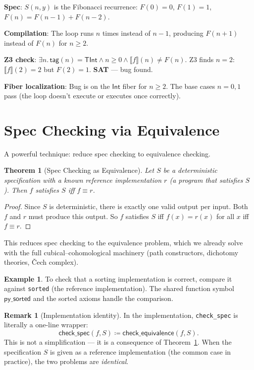 \documentclass[11pt,a4paper]{report}
\theoremstyle{definition}
\newtheorem{example}[definition]{Example}
\newtheorem{remark}[definition]{Remark}
\theoremstyle{plain}
\newtheorem{theorem}[definition]{Theorem}
\newcommand{\den}[1]{\llbracket #1 \rrbracket}
\begin{document}
\textbf{Spec}: $S(n, y)$ is the Fibonacci recurrence:
$F(0) = 0$, $F(1) = 1$, $F(n) = F(n-1) + F(n-2)$.

\textbf{Compilation}: The loop runs $n$ times instead of $n-1$,
producing $F(n+1)$ instead of $F(n)$ for $n \geq 2$.

\textbf{Z3 check}: $\exists n.\, \mathsf{tag}(n) = \mathsf{TInt}
\land n \geq 0 \land \den{f}(n) \neq F(n)$.  Z3 finds $n = 2$:
$\den{f}(2) = 2$ but $F(2) = 1$.  \textbf{SAT} --- bug found.

\textbf{Fiber localization}: Bug is on the $\mathsf{Int}$ fiber for
$n \geq 2$.  The base cases $n = 0, 1$ pass (the loop doesn't execute
or executes once correctly).

\section{Spec Checking via Equivalence}

A powerful technique: reduce spec checking to equivalence checking.

\begin{theorem}[Spec Checking as Equivalence]
\label{thm:spec-as-equiv}
Let $S$ be a deterministic specification with a known \emph{reference
implementation} $r$ (a program that satisfies $S$).  Then $f$ satisfies
$S$ iff $f \equiv r$.
\end{theorem}

\begin{proof}
Since $S$ is deterministic, there is exactly one valid output per
input.  Both $f$ and $r$ must produce this output.  So $f$ satisfies
$S$ iff $f(x) = r(x)$ for all $x$ iff $f \equiv r$.
\end{proof}

This reduces spec checking to the equivalence problem, which we
already solve with the full cubical--cohomological machinery
(path constructors, dichotomy theories, \v{C}ech complex).

\begin{example}
To check that a sorting implementation is correct, compare it against
\texttt{sorted} (the reference implementation).  The shared function
symbol $\mathsf{py\_sorted}$ and the sorted axioms handle the
comparison.
\end{example}

\begin{remark}[Implementation identity]
In the implementation, \texttt{check\_spec} is literally
a one-line wrapper:
\[
  \mathsf{check\_spec}(f, S) \coloneqq \mathsf{check\_equivalence}(f, S).
\]
This is not a simplification --- it is a consequence of
Theorem~\ref{thm:spec-as-equiv}.  When the specification $S$ is
given as a reference implementation (the common case in practice), the
two problems are \emph{identical}.
\end{remark}
\end{document}
